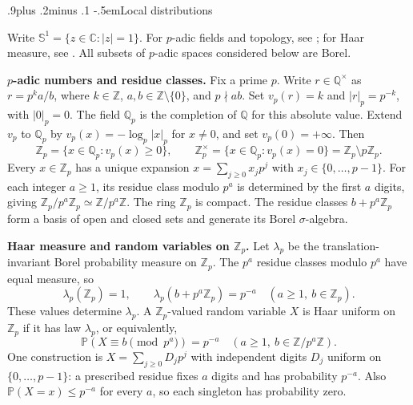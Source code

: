 \documentclass[twoside]{aomart}
\makeatletter
\theoremstyle{paperplain}
\theoremstyle{paperdefinition}
\renewcommand\subsection{\@startsection{subsection}{2}{\z@}
  {.9\baselineskip plus .2\baselineskip minus .1\baselineskip}
  {-.5em}{\normalfont\bfseries}}
\newcommand{\Z}{\mathbb Z}
\newcommand{\Q}{\mathbb Q}
\newcommand{\C}{\mathbb C}
\newcommand{\Pp}{\mathbb P}
\numberwithin{equation}{section}
\makeatother
\begin{document}
\subsection{Local distributions}

Write $\mathbb S^1=\{z\in\C:|z|=1\}$. For $p$-adic
fields and topology, see
\cite[Sections~3.1--3.2 and 4.1--4.4]{GouveaPadic};
for Haar measure, see
\cite[Section~6, Proposition~I.6.3]{CasselmanHaar}.
All subsets of $p$-adic spaces considered below are Borel.

\par\smallskip\noindent\textbf{$p$-adic numbers and residue classes.}
Fix a prime $p$. Write $r\in\Q^\times$ as $r=p^k a/b$,
where $k\in\Z$, $a,b\in\Z\setminus\{0\}$, and $p\nmid ab$.
Set $v_p(r)=k$ and $|r|_p=p^{-k}$, with $|0|_p=0$.
The field $\Q_p$ is the completion of $\Q$ for this
absolute value. Extend $v_p$ to $\Q_p$ by
$v_p(x)=-\log_p|x|_p$ for $x\ne0$, and set
$v_p(0)=+\infty$. Then
\begin{equation*}
 \Z_p=\{x\in\Q_p:v_p(x)\ge0\},\qquad
 \Z_p^\times=\{x\in\Q_p:v_p(x)=0\}
              =\Z_p\setminus p\Z_p.
\end{equation*}
Every $x\in\Z_p$ has a unique expansion
$\displaystyle x=\sum_{j\ge0}x_jp^j$ with $x_j\in\{0,\ldots,p-1\}$.
For each integer $a\ge1$, its residue class modulo $p^a$
is determined by the first $a$ digits, giving
$\Z_p/p^a\Z_p\simeq\Z/p^a\Z$.
The ring $\Z_p$ is compact. The residue classes
$b+p^a\Z_p$ form a basis of open and closed sets and
generate its Borel $\sigma$-algebra.

\par\smallskip\noindent\textbf{Haar measure and random variables on $\Z_p$.}
Let $\lambda_p$ be the translation-invariant Borel
probability measure on $\Z_p$. The $p^a$ residue classes
modulo $p^a$ have equal measure, so
\begin{equation}
 \lambda_p(\Z_p)=1,\qquad
 \lambda_p(b+p^a\Z_p)=p^{-a}
 \quad(a\ge1,\ b\in\Z_p).
 \label{ar:haar-residues}
\end{equation}
These values determine $\lambda_p$. A $\Z_p$-valued random variable
$X$ is Haar uniform on $\Z_p$ if it has law $\lambda_p$,
or equivalently,
\begin{equation*}
 \Pp(X\equiv b\pmod{p^a})=p^{-a}
 \quad(a\ge1,\ b\in\Z/p^a\Z).
\end{equation*}
One construction is $\displaystyle X=\sum_{j\ge0}D_jp^j$ with independent
digits $D_j$ uniform on $\{0,\ldots,p-1\}$: a prescribed
residue fixes $a$ digits and has probability $p^{-a}$.
Also $\Pp(X=x)\le p^{-a}$ for every $a$, so each
singleton has probability zero.
\end{document}
